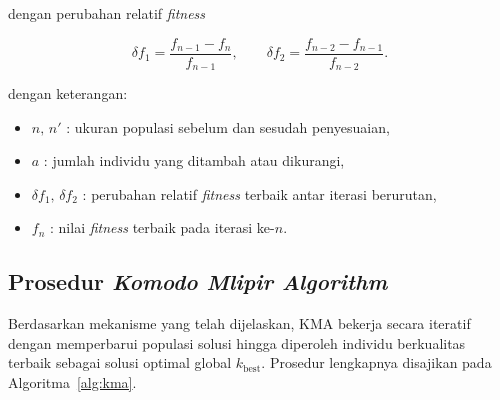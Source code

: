     dengan perubahan relatif \textit{fitness}

    \begin{equation}
        \label{eq:delta-fitness}
        \delta f_1 = \frac{f_{n-1} - f_n}{f_{n-1}},
        \qquad
        \delta f_2 = \frac{f_{n-2} - f_{n-1}}{f_{n-2}}.
    \end{equation}

    dengan keterangan:
    \begin{itemize}
        \item $n,\,n'$ : ukuran populasi sebelum dan sesudah penyesuaian,
        \item $a$ : jumlah individu yang ditambah atau dikurangi,
        \item $\delta f_1,\,\delta f_2$ : perubahan relatif \textit{fitness} terbaik antar iterasi berurutan,
        \item $f_n$ : nilai \textit{fitness} terbaik pada iterasi ke-$n$.
    \end{itemize}


    \subsection{Prosedur \textit{Komodo Mlipir Algorithm}}\label{sub:pseudocode}

    Berdasarkan mekanisme yang telah dijelaskan, KMA bekerja secara iteratif dengan memperbarui populasi solusi hingga diperoleh individu berkualitas terbaik sebagai solusi optimal global $k_{\text{best}}$. Prosedur lengkapnya disajikan pada Algoritma~\ref{alg:kma}.

